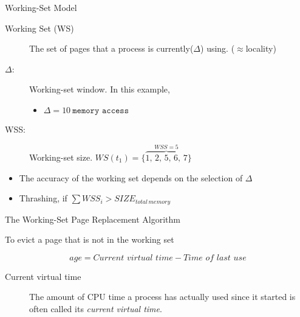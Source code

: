 \begin{frame}{Working-Set Model}
  \begin{description}
  \item[Working Set (WS)] The set of pages that a process is currently($\Delta$)
    using. ($\approx{}$locality)
  \end{description}
  \begin{center}
     
  \end{center}
  \begin{block}{}
    \begin{description}
    \item[$\Delta$:] Working-set window. In this example,
      \begin{itemize}
      \item[] $\Delta=10\ \texttt{memory access}$
      \end{itemize}
    \item[WSS:] Working-set size.  $WS(t_1)=\{\overbrace{1,\,2,\,5,\,6,\,7}^{WSS=5}\}$
    \end{description}
  \end{block}
  \begin{itemize}
  \item The accuracy of the working set depends on the selection of $\Delta$
  \item Thrashing, if $\sum{}WSS_i > SIZE_{total\,memory}$
  \end{itemize}
\end{frame}

\begin{frame}{The Working-Set Page Replacement Algorithm}
  \begin{block}{To evict a page that is not in the working set}
    \begin{center}
    \end{center}
    $$age = \textit{Current virtual time} - \textit{Time of last use}$$
  \end{block}
\end{frame}

\begin{description}
\item[Current virtual time] The amount of CPU time a process has actually used since it
  started is often called its \emph{current virtual time}.
\end{description}

